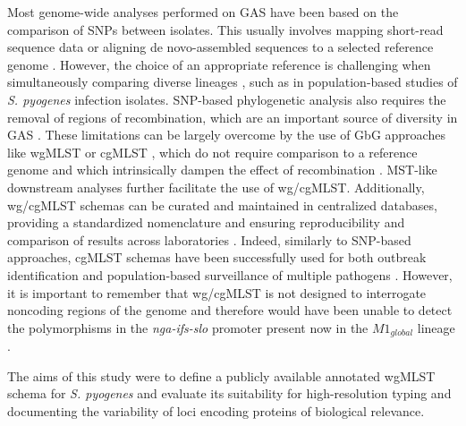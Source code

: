 Most genome-wide analyses performed on \ac{GAS} have been based on the comparison of \acp{SNP} between isolates. This usually involves mapping short-read sequence data or aligning de novo-assembled sequences to a selected reference genome \cite{turner_emergence_2015, zhu_molecular_2015, zhu_trading_2015, lynskey_emergence_2019, nasser_evolutionary_2014, beres_molecular_2010, turner_community_2017, coelho_genomic_2019, davies_atlas_2019}. However, the choice of an appropriate reference is challenging when simultaneously comparing diverse lineages \cite{maiden_mlst_2013, neumann_core_2019}, such as in population-based studies of \textit{S. pyogenes} infection isolates. \ac{SNP}-based phylogenetic analysis also requires the removal of regions of recombination, which are an important source of diversity in \ac{GAS} \cite{davies_atlas_2019, maiden_mlst_2013, neumann_core_2019, mcgregor_multilocus_2004}. These limitations can be largely overcome by the use of \ac{GbG} approaches like \ac{wgMLST} or \ac{cgMLST} \cite{carrico_primer_2018}, which do not require comparison to a reference genome and which intrinsically dampen the effect of recombination \cite{maiden_mlst_2013, neumann_core_2019, leopold_bacterial_2014}. \ac{MST}-like downstream analyses further facilitate the use of \ac{wg/cgMLST}. Additionally, \ac{wg/cgMLST} schemas can be curated and maintained in centralized databases, providing a standardized nomenclature and ensuring reproducibility and comparison of results across laboratories \cite{maiden_mlst_2013, carrico_primer_2018, higgins_development_2017, bletz_defining_2018}. Indeed, similarly to \ac{SNP}-based approaches, \ac{cgMLST} schemas have been successfully used for both outbreak identification and population-based surveillance of multiple pathogens \cite{neumann_core_2019, leopold_bacterial_2014, higgins_development_2017, bletz_defining_2018, abdel-glil_whole-genome-based_2021, pinto_insights_2019, bardenstein_brucellosis_2021}. However, it is important to remember that \ac{wg/cgMLST} is not designed to interrogate noncoding regions of the genome and therefore would have been unable to detect the polymorphisms in the \textit{nga-ifs-slo} promoter present now in the $M1_{global}$ lineage \cite{lynskey_emergence_2019}.

The aims of this study were to define a publicly available annotated \ac{wgMLST} schema for \textit{S. pyogenes} and evaluate its suitability for high-resolution typing and documenting the variability of loci encoding proteins of biological relevance.

